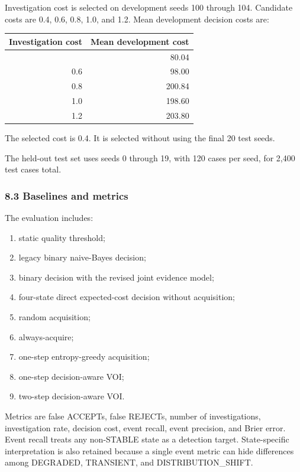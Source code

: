 \documentclass[
]{article}
\providecommand{\tightlist}{%
  \setlength{\itemsep}{0pt}\setlength{\parskip}{0pt}}
\begin{document}
Investigation cost is selected on development seeds 100 through 104. Candidate costs are 0.4, 0.6, 0.8, 1.0, and 1.2. Mean development decision costs are:

\begin{longtable}[]{@{}rr@{}}
\toprule\noalign{}
Investigation cost & Mean development cost \\
\midrule\noalign{}
\endhead
\bottomrule\noalign{}
\endlastfoot
0.4 & 80.04 \\
0.6 & 98.00 \\
0.8 & 200.84 \\
1.0 & 198.60 \\
1.2 & 203.80 \\
\end{longtable}

The selected cost is 0.4. It is selected without using the final 20 test seeds.

The held-out test set uses seeds 0 through 19, with 120 cases per seed, for 2,400 test cases total.

\subsubsection{8.3 Baselines and metrics}\label{83-baselines-and-metrics}

The evaluation includes:

\begin{enumerate}
\def\labelenumi{\arabic{enumi}.}
\tightlist
\item
  static quality threshold;
\item
  legacy binary naive-Bayes decision;
\item
  binary decision with the revised joint evidence model;
\item
  four-state direct expected-cost decision without acquisition;
\item
  random acquisition;
\item
  always-acquire;
\item
  one-step entropy-greedy acquisition;
\item
  one-step decision-aware VOI;
\item
  two-step decision-aware VOI.
\end{enumerate}

Metrics are false ACCEPTs, false REJECTs, number of investigations, investigation rate, decision cost, event recall, event precision, and Brier error. Event recall treats any non-STABLE state as a detection target. State-specific interpretation is also retained because a single event metric can hide differences among DEGRADED, TRANSIENT, and DISTRIBUTION\_SHIFT.
\end{document}
